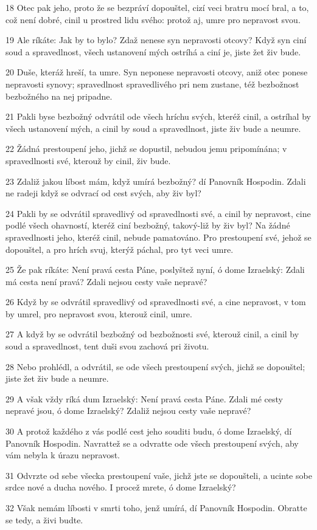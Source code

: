 \par 18 Otec pak jeho, proto že se bezpráví dopouštel, cizí veci bratru mocí bral, a to, což není dobré, cinil u prostred lidu svého: protož aj, umre pro nepravost svou.
\par 19 Ale ríkáte: Jak by to bylo? Zdaž nenese syn nepravosti otcovy? Když syn ciní soud a spravedlnost, všech ustanovení mých ostríhá a ciní je, jiste žet živ bude.
\par 20 Duše, kteráž hreší, ta umre. Syn neponese nepravosti otcovy, aniž otec ponese nepravosti synovy; spravedlnost spravedlivého pri nem zustane, též bezbožnost bezbožného na nej pripadne.
\par 21 Pakli byse bezbožný odvrátil ode všech hríchu svých, kteréž cinil, a ostríhal by všech ustanovení mých, a cinil by soud a spravedlnost, jiste živ bude a neumre.
\par 22 Žádná prestoupení jeho, jichž se dopustil, nebudou jemu pripomínána; v spravedlnosti své, kterouž by cinil, živ bude.
\par 23 Zdaliž jakou líbost mám, když umírá bezbožný? dí Panovník Hospodin. Zdali ne radeji když se odvrací od cest svých, aby živ byl?
\par 24 Pakli by se odvrátil spravedlivý od spravedlnosti své, a cinil by nepravost, cine podlé všech ohavností, kteréž ciní bezbožný, takový-liž by živ byl? Na žádné spravedlnosti jeho, kteréž cinil, nebude pamatováno. Pro prestoupení své, jehož se dopouštel, a pro hrích svuj, kterýž páchal, pro tyt veci umre.
\par 25 Že pak ríkáte: Není pravá cesta Páne, poslyštež nyní, ó dome Izraelský: Zdali má cesta není pravá? Zdali nejsou cesty vaše nepravé?
\par 26 Když by se odvrátil spravedlivý od spravedlnosti své, a cine nepravost, v tom by umrel, pro nepravost svou, kterouž cinil, umre.
\par 27 A když by se odvrátil bezbožný od bezbožnosti své, kterouž cinil, a cinil by soud a spravedlnost, tent duši svou zachová pri životu.
\par 28 Nebo prohlédl, a odvrátil, se ode všech prestoupení svých, jichž se dopouštel; jiste žet živ bude a neumre.
\par 29 A však vždy ríká dum Izraelský: Není pravá cesta Páne. Zdali mé cesty nepravé jsou, ó dome Izraelský? Zdaliž nejsou cesty vaše nepravé?
\par 30 A protož každého z vás podlé cest jeho souditi budu, ó dome Izraelský, dí Panovník Hospodin. Navrattež se a odvratte ode všech prestoupení svých, aby vám nebyla k úrazu nepravost.
\par 31 Odvrzte od sebe všecka prestoupení vaše, jichž jste se dopoušteli, a ucinte sobe srdce nové a ducha nového. I procež mrete, ó dome Izraelský?
\par 32 Však nemám líbosti v smrti toho, jenž umírá, dí Panovník Hospodin. Obratte se tedy, a živi budte.

